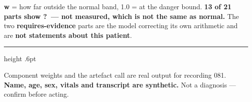 \documentclass[9pt,a4paper]{extarticle}
\newcommand{\Q}{{\bfseries\normalsize ?}}
\begin{document}
\vspace{3pt}
{\footnotesize\color{ink}\textbf{w} = how far outside the normal band, 1.0 = at the danger
bound. \textbf{13 of 21 parts show \Q\ --- not measured, which is not the same as normal.}
The two {\color{carte}\textbf{requires-evidence}} parts are the model correcting its own arithmetic and
are \textbf{not statements about this patient}.\par}

\vspace{6pt}
{\color{rule}\hrule height .6pt}
\vspace{3pt}
{\footnotesize\color{faint}Component weights and the artefact call are real output for recording
081. \textbf{Name, age, sex, vitals and transcript are synthetic.} Not a diagnosis --- confirm
before acting.\par}
\end{document}
